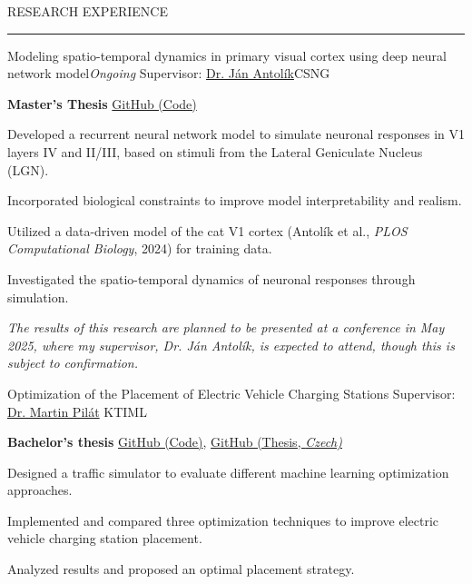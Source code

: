 \documentclass{resume} %
\renewenvironment{rSection}[1]{
\sectionskip
\textcolor{CarnegieMellonRed}{\MakeUppercase{#1}}
\sectionlineskip
\hrule
\begin{list}{}{
\setlength{\leftmargin}{1.5em}
}
\item[]
}{
\end{list}
}
\begin{document}
\begin{rSection}{Research Experience}
\begin{rProject}{\large Modeling spatio-temporal dynamics in primary visual cortex 
\newline using deep neural network model}{\em Ongoing}
{Supervisor: \href{https://www.mff.cuni.cz/en/faculty/organizational-structure/people?hdl=11457}{Dr. Ján Antolík}}{CSNG}
    \item \textbf{Master’s Thesis} \vline \: \href{https://github.com/dbeinhauer/mcs-source}{GitHub (Code)}
    \item Developed a recurrent neural network model to simulate neuronal responses 
    in V1 layers IV and II/III, based on stimuli from the Lateral Geniculate Nucleus (LGN).
    \item Incorporated biological constraints to improve model interpretability and realism.
    \item Utilized a data-driven model of the cat V1 cortex (Antolík et al., \emph{PLOS Computational Biology}, 2024) for training data.
    \item Investigated the spatio-temporal dynamics of neuronal responses through simulation.
    \item \em The results of this research are planned to be presented at a conference in May 2025, where my supervisor, Dr. Ján Antolík, is expected to attend, though this is subject to confirmation.
\end{rProject}


\begin{rProject}{\large Optimization of the Placement of Electric Vehicle Charging Stations}{}
{Supervisor: \href{https://www.mff.cuni.cz/en/faculty/organizational-structure/people?hdl=4171}
{Dr. Martin Pilát}}
{KTIML}
    \item \textbf{Bachelor's thesis} \vline \: 
    \href{https://github.com/dbeinhauer/bcs-source}{GitHub (Code)},
    \href{https://github.com/dbeinhauer/bcs-thesis}{GitHub (Thesis, \em Czech)}
    \item Designed a traffic simulator to evaluate different machine learning 
    optimization approaches.
    \item Implemented and compared three optimization techniques to improve 
    electric vehicle charging station placement.
    \item Analyzed results and proposed an optimal placement strategy.
\end{rProject}

\newpage


\end{rSection}
\end{document}
